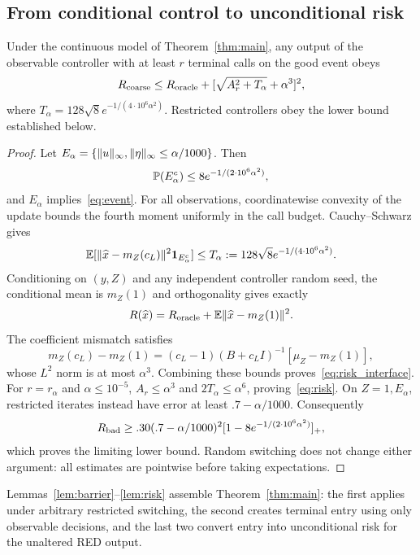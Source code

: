 \subsection{From conditional control to unconditional risk}
\begin{lemma}\label{lem:risk}
Under the continuous model of Theorem~\ref{thm:main}, any output of the observable controller with at least $r$ terminal calls on the good event obeys
\begin{equation}\label{eq:risk_interface}
R_{\rm coarse}\le R_{\rm oracle}+[\sqrt{A_r^2+T_\alpha}+\alpha^3]^2,
\end{equation}
where $T_\alpha=128\sqrt8e^{-1/(4\cdot10^6\alpha^2)}$. Restricted controllers obey the lower bound established below.
\end{lemma}
\begin{proof}
Let $E_\alpha=\{\lVert u\rVert_\infty,\lVert\eta\rVert_\infty\le\alpha/1000\}$. Then
\begin{equation}
\mathbb P(E_\alpha^c)\le8e^{-1/(2\cdot10^6\alpha^2)},
\end{equation}
and $E_\alpha$ implies~\eqref{eq:event}. For all observations, coordinatewise convexity of the update bounds the fourth moment uniformly in the call budget. Cauchy--Schwarz gives
\begin{equation}
\mathbb E[\lVert\widehat x-m_Z(c_L)\rVert^2\mathbf1_{E_\alpha^c}]
\le T_\alpha:=128\sqrt8e^{-1/(4\cdot10^6\alpha^2)}.
\end{equation}
Conditioning on $(y,Z)$ and any independent controller random seed, the conditional mean is $m_Z(1)$ and orthogonality gives exactly
\begin{equation}
R(\widehat x)=R_{\rm oracle}+\mathbb E\lVert\widehat x-m_Z(1)\rVert^2.
\end{equation}
The coefficient mismatch satisfies
\begin{equation}
m_Z(c_L)-m_Z(1)=(c_L-1)(B+c_LI)^{-1}[\mu_Z-m_Z(1)],
\end{equation}
whose $L^2$ norm is at most $\alpha^3$. Combining these bounds proves~\eqref{eq:risk_interface}.
For $r=r_\alpha$ and $\alpha\le10^{-5}$, $A_r\le\alpha^3$ and $2T_\alpha\le\alpha^6$, proving~\eqref{eq:risk}. On $Z=1,E_\alpha$, restricted iterates instead have error at least $.7-\alpha/1000$. Consequently
\begin{equation}
R_{\rm bad}\ge .30(.7-\alpha/1000)^2
 [1-8e^{-1/(2\cdot10^6\alpha^2)}]_+,
\end{equation}
which proves the limiting lower bound. Random switching does not change either argument: all estimates are pointwise before taking expectations.
\end{proof}
Lemmas~\ref{lem:barrier}--\ref{lem:risk} assemble Theorem~\ref{thm:main}: the first applies under arbitrary restricted switching, the second creates terminal entry using only observable decisions, and the last two convert entry into unconditional risk for the unaltered RED output.
